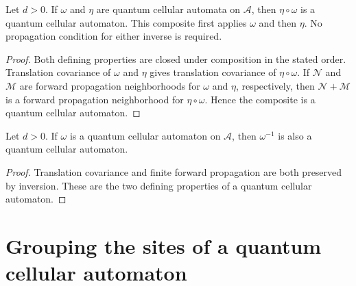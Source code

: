 \begin{lemma}
    \label{thm:qca_composition}
    \leanok
    Let $d>0$.  If $\omega$ and $\eta$ are quantum cellular automata on
    $\mathcal A$, then $\eta\circ\omega$ is a quantum cellular automaton.  This
    composite first applies $\omega$ and then $\eta$.  No propagation condition
    for either inverse is required.
\end{lemma}

\begin{proof}\leanok
    Both defining properties are closed under composition in the stated order.
    Translation covariance of $\omega$ and $\eta$ gives translation covariance
    of $\eta\circ\omega$.  If $\mathcal N$ and $\mathcal M$ are forward
    propagation neighborhoods for $\omega$ and $\eta$, respectively, then
    $\mathcal N+\mathcal M$ is a forward propagation neighborhood for
    $\eta\circ\omega$.  Hence the composite is a quantum cellular automaton.
\end{proof}

\begin{lemma}
    \label{thm:qca_inverse}
    \leanok
    Let $d>0$.  If $\omega$ is a quantum cellular automaton on $\mathcal A$, then
    $\omega^{-1}$ is also a quantum cellular automaton.
\end{lemma}

\begin{proof}\leanok
    Translation covariance and finite forward propagation are both preserved by
    inversion.  These are the two defining properties of a quantum cellular
    automaton.
\end{proof}

\section{Grouping the sites of a quantum cellular automaton}

